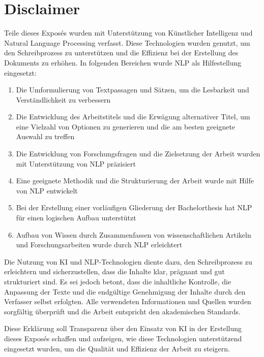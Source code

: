 
\section*{Disclaimer}

Teile dieses Exposés wurden mit Unterstützung von Künstlicher Intelligenz und Natural Language Processing verfasst. Diese Technologien wurden genutzt, um den Schreibprozess zu unterstützen und die Effizienz bei der Erstellung des Dokuments zu erhöhen. In folgenden Bereichen wurde NLP als Hilfestellung eingesetzt:

\begin{enumerate}
    \item Die Umformulierung von Textpassagen und Sätzen, um die Lesbarkeit und Verständlichkeit zu verbessern
    \item Die Entwicklung des Arbeitstitels und die Erwägung alternativer Titel, um eine Vielzahl von Optionen zu generieren und die am besten geeignete Auswahl zu treffen
    \item Die Entwicklung von Forschungsfragen und die Zielsetzung der Arbeit wurden mit Unterstützung von NLP präzisiert
    \item Eine geeignete Methodik und die Strukturierung der Arbeit wurde mit Hilfe von NLP entwickelt
    \item Bei der Erstellung einer vorläufigen Gliederung der Bachelorthesis hat NLP für einen logischen Aufbau unterstützt
    \item Aufbau von Wissen durch Zusammenfassen von wissenschaftlichen Artikeln und Forschungsarbeiten wurde durch NLP erleichtert
\end{enumerate}

Die Nutzung von KI und NLP-Technologien diente dazu, den Schreibprozess zu erleichtern und sicherzustellen, dass die Inhalte klar, prägnant und gut strukturiert sind. Es sei jedoch betont, dass die inhaltliche Kontrolle, die Anpassung der Texte und die endgültige Genehmigung der Inhalte durch den Verfasser selbst erfolgten. Alle verwendeten Informationen und Quellen wurden sorgfältig überprüft und die Arbeit entspricht den akademischen Standards.

Diese Erklärung soll Transparenz über den Einsatz von KI in der Erstellung dieses Exposés schaffen und aufzeigen, wie diese Technologien unterstützend eingesetzt wurden, um die Qualität und Effizienz der Arbeit zu steigern. 

\clearpage